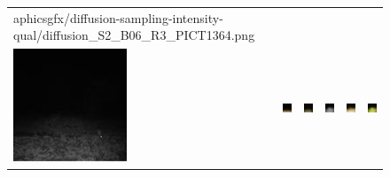 \begin{figure}[htp!]
\begin{tabularx}{\textwidth}{Y Y Y !{\space} Y Y Y}
aphics{gfx/diffusion-sampling-intensity-qual/diffusion_S2_B06_R3_PICT1364.png} \\
        \includegraphics{gfx/diffusion-sampling-intensity-qual/nir_S2_B06_R3_PICT3848.jpg} & \includegraphics{gfx/diffusion-sampling-intensity-qual/cyclegan_S2_B06_R3_PICT3848_fake.png} & \includegraphics{gfx/diffusion-sampling-intensity-qual/diffusion_S2_B06_R3_PICT3848.png} & \includegraphics{gfx/diffusion-sampling-intensity-qual/nir_S2_B07_R1_PICT3274.jpg} & \includegraphics{gfx/diffusion-sampling-intensity-qual/cyclegan_S2_B07_R1_PICT3274_fake.png} & \includegraphics{gfx/diffusion-sampling-intensity-qual/diffusion_S2_B07_R1_PICT3274.png}

\end{tabularx}
\end{figure}
